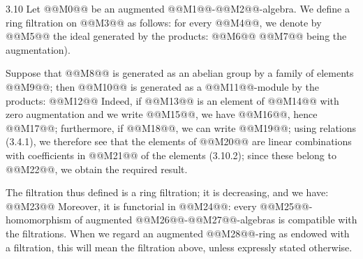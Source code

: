 3.10
Let @@M0@@ be an augmented @@M1@@-@@M2@@-algebra. We define a ring filtration on @@M3@@ as follows: for every @@M4@@, we denote by @@M5@@ the ideal generated by the products:
@@M6@@
@@M7@@ being the augmentation).

Suppose that @@M8@@ is generated as an abelian group by a family of elements @@M9@@; then @@M10@@ is generated as a @@M11@@-module by the products:
@@M12@@
Indeed, if @@M13@@ is an element of @@M14@@ with zero augmentation and we write @@M15@@, we have @@M16@@, hence @@M17@@; furthermore, if @@M18@@, we can write @@M19@@; using relations (3.4.1), we therefore see that the elements of @@M20@@ are linear combinations with coefficients in @@M21@@ of the elements (3.10.2); since these belong to @@M22@@, we obtain the required result.

The filtration thus defined is a ring filtration; it is decreasing, and we have:
@@M23@@
Moreover, it is functorial in @@M24@@: every @@M25@@-homomorphism of augmented @@M26@@-@@M27@@-algebras is compatible with the filtrations. When we regard an augmented @@M28@@-ring as endowed with a filtration, this will mean the filtration above, unless expressly stated otherwise.

